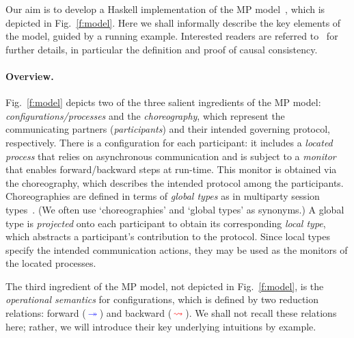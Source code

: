 \documentclass[runningheads,plain]{llncs}
\begin{document}
Our aim is to develop a Haskell implementation of the MP model~\cite{DBLP:conf/ppdp/MezzinaP17}, which is depicted in Fig.~\ref{f:model}. 
Here we shall  informally describe the key elements of the model, guided by a running example. Interested readers are referred to~\cite{DBLP:conf/ppdp/MezzinaP17} for further details, in particular the definition and proof of causal consistency. 

\paragraph{Overview.}
Fig.~\ref{f:model} depicts two of the three salient ingredients of the MP model:
\emph{configurations/processes} and the
\emph{choreography}, which represent the communicating partners (\emph{participants}) and their intended governing protocol, respectively. 
There is a {configuration} for each participant: it includes a \emph{located process} that relies on asynchronous communication and is subject to a \emph{monitor} that enables forward/backward steps at run-time. This monitor is obtained via the choreography, which describes the intended protocol among the {participants}. 
Choreographies are defined in terms of \emph{global types} as in multiparty session types~\cite{DBLP:conf/popl/HondaYC08}. 
(We often use `choreographies' and `global types' as synonyms.)
A global type is \emph{projected} onto each participant to obtain 
its corresponding  \emph{local type}, which abstracts a participant's contribution to the protocol. 
Since  local types specify the intended communication actions, they may be used as the monitors of the located processes. 

The third ingredient of the MP model, not depicted in Fig.~\ref{f:model}, is the \emph{operational semantics} for configurations, which  is defined by two reduction relations: forward ($\textcolor{blue}{\,\twoheadrightarrow\,}$) and backward ($\textcolor{red}{\,\rightsquigarrow\,}$). We shall not recall these relations here; rather, we will introduce their key underlying intuitions by example.
\end{document}
